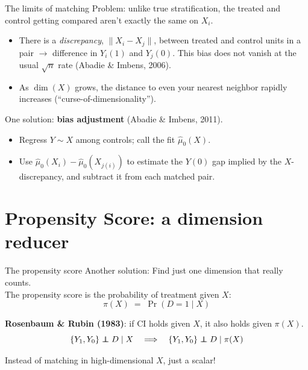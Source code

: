 \documentclass[xcolor=dvipsnames]{beamer}
\newcommand\indep{\protect\mathpalette{\protect\independenT}{\perp}}
\def\independenT#1#2{\mathrel{\rlap{$#1#2$}\mkern2mu{#1#2}}}
\begin{document}
\begin{frame}{The limits of matching}
\small
{} Problem: unlike true stratification, the treated and control getting compared aren't exactly the same on $X_i$.
\begin{itemize}
\footnotesize
\item There is a \textit{discrepancy}, $\|X_i-X_j\|$, between treated and control units in a pair $\rightarrow$ difference in $Y_i(1)$ and $Y_j(0)$.  This bias does not vanish at the usual $\sqrt n$ rate (Abadie \& Imbens, 2006).
\item As $\dim(X)$ grows, the distance to even your nearest neighbor rapidly increases (``curse-of-dimensionality'').
\end{itemize}

\bigskip
\small
{} One solution: \textbf{bias adjustment} (Abadie \& Imbens, 2011).
\begin{itemize}
\footnotesize
\item Regress $Y \sim X$ among controls; call the fit $\widehat{\mu}_0(X)$.
\item Use $\widehat{\mu}_0(X_i) - \widehat{\mu}_0(X_{j(i)})$ to estimate the $Y(0)$ gap implied by the $X$-discrepancy, and subtract it from each matched pair.
\end{itemize}
\end{frame}


\section{Propensity Score: a dimension reducer}

\begin{frame}{The propensity score}
\small
{} Another solution: Find just one dimension that really counts. \\
\medskip
{} The propensity score is the probability of treatment given $X$:\\

$$\pi(X) \;=\; \Pr(D = 1 \mid X)$$

\medskip
{} \textbf{Rosenbaum \& Rubin (1983)}: if CI holds given $X$, it also holds given $\pi(X)$.\\
$$\{Y_1, Y_0\} \indep D \mid X \quad \Longrightarrow \quad \{Y_1, Y_0\} \indep D \mid \pi(X)$$

\bigskip
{} Instead of matching in high-dimensional $X$, just a scalar!
\end{frame}
\end{document}
